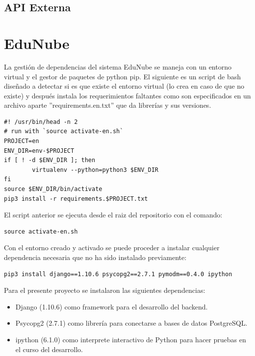 
%
%

\subsection{API Externa}

\section{EduNube}


La gestión de dependencias del sistema EduNube se maneja con un entorno virtual y el gestor de paquetes de python pip. El siguiente es un script de bash diseñado a detectar si es que existe el entorno virtual (lo crea en caso de que no existe) y después instala los requerimientos faltantes como son especificados en un archivo aparte ''requirements.en.txt'' que da librerías y sus versiones.

\begin{lstlisting}
#! /usr/bin/head -n 2
# run with `source activate-en.sh`
PROJECT=en
ENV_DIR=env-$PROJECT
if [ ! -d $ENV_DIR ]; then
        virtualenv --python=python3 $ENV_DIR
fi
source $ENV_DIR/bin/activate
pip3 install -r requirements.$PROJECT.txt
\end{lstlisting}

El script anterior se ejecuta desde el raiz del repositorio con el comando:

\begin{lstlisting}
source activate-en.sh
\end{lstlisting}

Con el entorno creado y activado se puede proceder a instalar cualquier dependencia necesaria que no ha sido instalado previamente:

\begin{lstlisting}
pip3 install django==1.10.6 psycopg2==2.7.1 pymodm==0.4.0 ipython
\end{lstlisting}

Para el presente proyecto se instalaron las siguientes dependencias:
\begin{itemize}
	\item Django (1.10.6) como framework para el desarrollo del backend.
    \item Psycopg2 (2.7.1) como librería para conectarse a bases de datos PostgreSQL.
    \item ipython (6.1.0) como interprete interactivo de Python para hacer pruebas en el curso del desarrollo.
\end{itemize}

